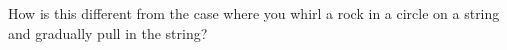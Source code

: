 How is this different
from the case where you whirl a rock in a circle on a string
and gradually pull in the string?
